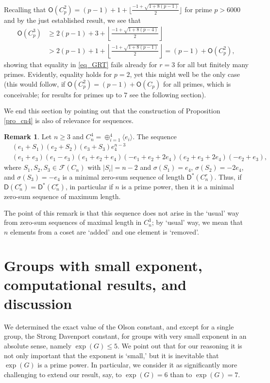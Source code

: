 \documentclass{amsart}
\theoremstyle{definition}
\newtheorem{rem}[thm]{Remark}
\numberwithin{equation}{section}
\begin{document}
Recalling that ${\mathsf{O}}(C_p^2) = (p-1) + 1 + \lfloor \frac{-1 + \sqrt{1+ 8(p-1)}}{2} \rfloor$ for prime $p>6000$ and
by the just established result,
we see that
\[\begin{split}
{\mathsf{O}}(C_p^3) & \ge 2(p-1) + 3+ \left \lfloor \frac{-1 + \sqrt{1+ 8(p-4)}}{2} \right\rfloor\\
  & > 2(p-1) + 1 + \left \lfloor \frac{-1 + \sqrt{1+ 8(p-1)}}{2} \right \rfloor = (p-1) + {\mathsf{O}}(C_p^2),\end{split}\]
showing that equality in \eqref{eq_GRT} fails already for $r=3$ for all but finitely many primes. Evidently, equality holds for $p=2$, yet this might well be the only case (this would follow, if ${\mathsf{O}}(C_p^2)=(p-1)+{\mathsf{O}}(C_p)$ for all primes, which is conceivable; for results for primes up to $7$ see the following section).

We end this section by pointing out that the construction of Proposition
\ref{pro_cn4} is also of relevance for sequences.

\begin{rem}
\label{rem_sequence}
Let $n\ge 3$ and $C_n^4 = \oplus_{i=1}^4 \langle e_i \rangle$. The sequence
\[
\begin{split}
& (e_1+S_1)(e_2+S_2)(e_3+S_3)e_4^{n-3}\\
& (e_1+e_3)(e_1-e_3)(e_1+e_2+e_4)(-e_1+e_2+2e_4)(e_2+e_3+2e_4)(-e_2+e_3),
\end{split}
\]
where $S_1,S_2,S_3 \in {{}^{{}}\!\mathcal{F}}(C_n)$ with $|S_i|=n-2$ and
$\sigma(S_1) = e_4$, $\sigma(S_2)= -2e_4$, and
$\sigma(S_3) = -e_4$
is a minimal zero-sum sequence of length ${\mathsf{D}^{\ast}}(C_n^r)$.
Thus, if ${\mathsf{D}}(C_n^r)={\mathsf{D}^{\ast}}(C_n^r)$, in particular if $n$ is a prime power, then it is a minimal zero-sum sequence of maximum length.
\end{rem}
The point of this remark is that this sequence does not
arise in the `usual' way from zero-sum sequences of maximal length in $C_n^3$;
by `usual' way, we mean that $n$ elements from a coset are `added' and one element is `removed'.

\section{Groups with small exponent,  computational results, and discussion}
\label{sec_small}

We determined the exact value of the Olson constant, and  except for a single group, the Strong Davenport constant, for groups with very small exponent in an absolute sense, namely $\exp(G)\le 5$.
We point out that for our reasoning it is not only important that the
exponent is `small,' but it is inevitable that $\exp(G)$ is a prime power.
In particular, we consider it as significantly more challenging to extend our result, say, to $\exp(G)=6$ than to $\exp(G)=7$.
\end{document}
